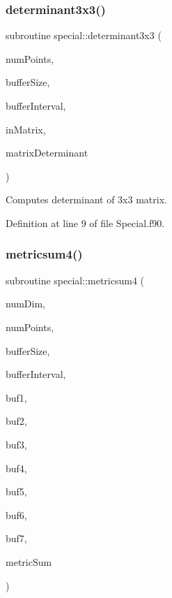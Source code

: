 \subsubsection{\texorpdfstring{determinant3x3()}{determinant3x3()}}
{\footnotesize\ttfamily subroutine special\+::determinant3x3 (\begin{DoxyParamCaption}\item[{integer(kind=8), intent(in)}]{num\+Points,  }\item[{integer(kind=8), dimension(3), intent(in)}]{buffer\+Size,  }\item[{integer(kind=8), dimension(6), intent(in)}]{buffer\+Interval,  }\item[{real(kind=8), dimension(9$\ast$numpoints), intent(in)}]{in\+Matrix,  }\item[{real(kind=8), dimension(numpoints), intent(inout)}]{matrix\+Determinant }\end{DoxyParamCaption})}



Computes determinant of 3x3 matrix. 



Definition at line 9 of file Special.\+f90.

\hypertarget{namespacespecial_a35dc32e6088894d25d79ce222235792c}{}\label{namespacespecial_a35dc32e6088894d25d79ce222235792c} 
\subsubsection{\texorpdfstring{metricsum4()}{metricsum4()}}
{\footnotesize\ttfamily subroutine special\+::metricsum4 (\begin{DoxyParamCaption}\item[{integer(kind=4), intent(in)}]{num\+Dim,  }\item[{integer(kind=8), intent(in)}]{num\+Points,  }\item[{integer(kind=8), dimension(numdim), intent(in)}]{buffer\+Size,  }\item[{integer(kind=8), dimension(2$\ast$numdim), intent(in)}]{buffer\+Interval,  }\item[{real(kind=8), dimension(numpoints), intent(in)}]{buf1,  }\item[{real(kind=8), dimension(numpoints), intent(in)}]{buf2,  }\item[{real(kind=8), dimension(numpoints), intent(in)}]{buf3,  }\item[{real(kind=8), dimension(numpoints), intent(in)}]{buf4,  }\item[{real(kind=8), dimension(numpoints), intent(in)}]{buf5,  }\item[{real(kind=8), dimension(numpoints), intent(in)}]{buf6,  }\item[{real(kind=8), dimension(numpoints), intent(in)}]{buf7,  }\item[{real(kind=8), dimension(numpoints), intent(inout)}]{metric\+Sum }\end{DoxyParamCaption})}



